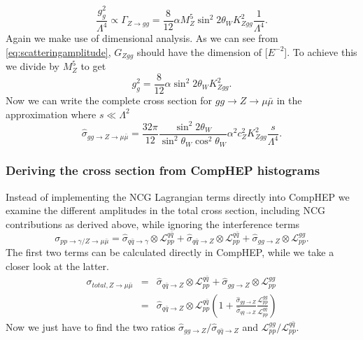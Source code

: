 \begin{equation}
	\frac{g_g^2}{\Lambda^4} \propto \Gamma_{Z \rightarrow gg} = \frac{8}{12} \alpha M_Z^5 \sin^2{2\theta_W} K_{Zgg}^2 \frac{1}{\Lambda^4}.
\end{equation}
Again we make use of dimensional analysis. As we can see from \eqref{eq:scatteringamplitude}, $G_{Zgg}$ should have the dimension of [$E^{-2}$]. To achieve this we divide by $M_Z^5$ to get
\begin{equation}
	g_g^2 = \frac{8}{12} \alpha \sin^2{2\theta_W} K_{Zgg}^2.
\end{equation}
Now we can write the complete cross section for $gg \rightarrow Z \rightarrow \mu \bar \mu$ in the approximation where $s \ll \Lambda^2$
\begin{equation} \label{eq:sigmahatgg}
	\hat \sigma_{gg \rightarrow Z \rightarrow \mu \bar \mu} = \frac{32\pi}{12} \frac{\sin^2{2\theta_W}}{\sin^2{\theta_W}\cos^2{\theta_W}} \alpha^2 c_Z^2 K_{Zgg}^2 \frac{s}{\Lambda^4}.
\end{equation}

\subsubsection{Deriving the cross section from CompHEP histograms}
Instead of implementing the NCG Lagrangian terms directly into CompHEP we examine the different amplitudes in the total cross section, including NCG contributions as derived above, while ignoring the interference terms
\begin{equation}
	\sigma_{pp \rightarrow \gamma/ Z \rightarrow \mu \bar \mu} = \hat \sigma_{q \bar q \rightarrow \gamma} \otimes \mathcal{L}_{pp}^{q \bar q}+ \hat \sigma_{q \bar q \rightarrow Z} \otimes \mathcal{L}_{pp}^{q \bar q}+ \hat \sigma_{gg \rightarrow Z} \otimes \mathcal{L}_{pp}^{gg}.
\end{equation}
The first two terms can be calculated directly in CompHEP, while we take a closer look at the latter. 
\begin{eqnarray} \label{eq:qqggztotal}
	\sigma_{total, Z \rightarrow \mu \bar \mu} &=& \hat \sigma_{q \bar q \rightarrow Z} \otimes \mathcal{L}_{pp}^{q \bar q}+ \hat \sigma_{gg \rightarrow Z} \otimes \mathcal{L}_{pp}^{gg} \nonumber \\
	&=&\hat \sigma_{q \bar q \rightarrow Z} \otimes \mathcal{L}_{pp}^{q \bar q} \left (1+ \frac{\hat \sigma_{gg \rightarrow Z}}{\hat \sigma_{q \bar q \rightarrow Z}} \frac{\mathcal{L}_{pp}^{gg}} {\mathcal{L}_{pp}^{q \bar q}} \right )
\end{eqnarray}
Now we just have to find the two ratios ${\hat \sigma_{gg \rightarrow Z}}/{\hat \sigma_{q \bar q \rightarrow Z}}$ and ${\mathcal{L}_{pp}^{gg}}/{\mathcal{L}_{pp}^{q \bar q}}$.

